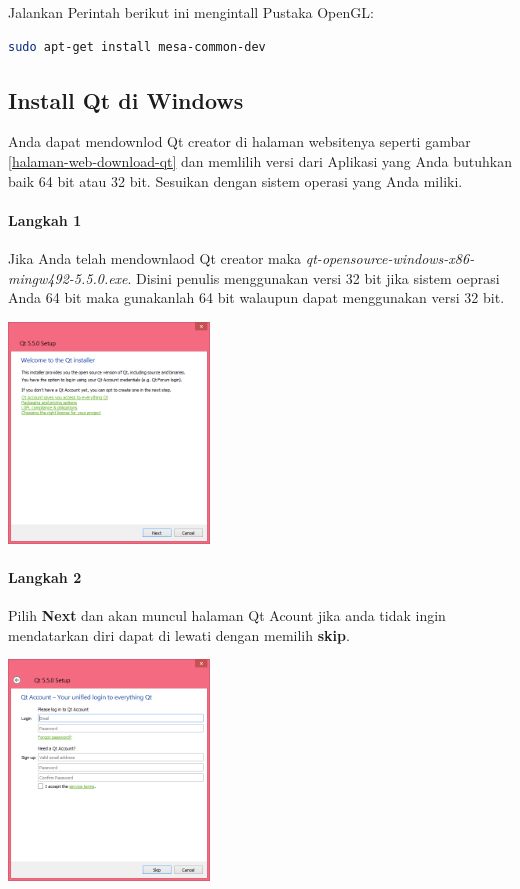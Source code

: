 Jalankan Perintah berikut ini mengintall Pustaka OpenGL:

\begin{lstlisting}[language=sh, numbers=none]
sudo apt-get install mesa-common-dev
\end{lstlisting}

\subsection{Install Qt di Windows}\label{install-qt-di-windows}

Anda dapat mendownlod Qt creator di halaman websitenya seperti gambar \ref{halaman-web-download-qt} dan memlilih versi
dari Aplikasi yang Anda butuhkan baik 64 bit atau 32 bit. Sesuikan
dengan sistem operasi yang Anda miliki.

\paragraph{Langkah 1}
  Jika Anda telah mendownlaod Qt creator maka
  \textit{qt-opensource-windows-x86-mingw492-5.5.0.exe}. Disini penulis
  menggunakan versi 32 bit jika sistem oeprasi Anda 64 bit maka
  gunakanlah 64 bit walaupun dapat menggunakan versi 32 bit.
 
\begin{center}
	 \includegraphics[width=0.4\textwidth]{../manuscript/images/install-qt-1.PNG}
\end{center}
 



\paragraph{Langkah 2}
  Pilih \textbf{Next} dan akan muncul halaman Qt Acount jika anda tidak
  ingin mendatarkan diri dapat di lewati dengan memilih \textbf{skip}.

\begin{center}
	 \includegraphics[width=0.4\textwidth]{../manuscript/images/install-qt-2.PNG}
\end{center}
 


